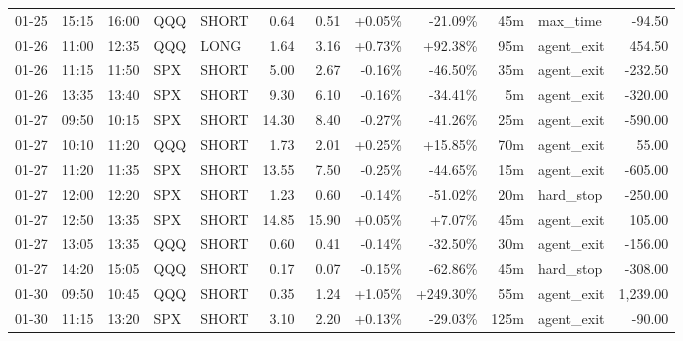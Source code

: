 \documentclass[11pt,a4paper,twoside]{article}
\begin{document}
\begin{center}
\begin{longtable}{>{\color{txtmain}}l l l l l r r r r r >{\color{txtmain}}l r}
01-25 & 15:15 & 16:00 & QQQ & SHORT & 0.64 & 0.51 & \textcolor{wingreen}{+0.05\%} & \textcolor{lossred}{-21.09\%} & 45m & max\_time & \textcolor{lossred}{-94.50} \\
01-26 & 11:00 & 12:35 & QQQ & LONG & 1.64 & 3.16 & \textcolor{wingreen}{+0.73\%} & \textcolor{wingreen}{+92.38\%} & 95m & agent\_exit & \textcolor{wingreen}{454.50} \\
01-26 & 11:15 & 11:50 & SPX & SHORT & 5.00 & 2.67 & \textcolor{lossred}{-0.16\%} & \textcolor{lossred}{-46.50\%} & 35m & agent\_exit & \textcolor{lossred}{-232.50} \\
01-26 & 13:35 & 13:40 & SPX & SHORT & 9.30 & 6.10 & \textcolor{lossred}{-0.16\%} & \textcolor{lossred}{-34.41\%} & 5m & agent\_exit & \textcolor{lossred}{-320.00} \\
01-27 & 09:50 & 10:15 & SPX & SHORT & 14.30 & 8.40 & \textcolor{lossred}{-0.27\%} & \textcolor{lossred}{-41.26\%} & 25m & agent\_exit & \textcolor{lossred}{-590.00} \\
01-27 & 10:10 & 11:20 & QQQ & SHORT & 1.73 & 2.01 & \textcolor{wingreen}{+0.25\%} & \textcolor{wingreen}{+15.85\%} & 70m & agent\_exit & \textcolor{wingreen}{55.00} \\
01-27 & 11:20 & 11:35 & SPX & SHORT & 13.55 & 7.50 & \textcolor{lossred}{-0.25\%} & \textcolor{lossred}{-44.65\%} & 15m & agent\_exit & \textcolor{lossred}{-605.00} \\
01-27 & 12:00 & 12:20 & SPX & SHORT & 1.23 & 0.60 & \textcolor{lossred}{-0.14\%} & \textcolor{lossred}{-51.02\%} & 20m & hard\_stop & \textcolor{lossred}{-250.00} \\
01-27 & 12:50 & 13:35 & SPX & SHORT & 14.85 & 15.90 & \textcolor{wingreen}{+0.05\%} & \textcolor{wingreen}{+7.07\%} & 45m & agent\_exit & \textcolor{wingreen}{105.00} \\
01-27 & 13:05 & 13:35 & QQQ & SHORT & 0.60 & 0.41 & \textcolor{lossred}{-0.14\%} & \textcolor{lossred}{-32.50\%} & 30m & agent\_exit & \textcolor{lossred}{-156.00} \\
01-27 & 14:20 & 15:05 & QQQ & SHORT & 0.17 & 0.07 & \textcolor{lossred}{-0.15\%} & \textcolor{lossred}{-62.86\%} & 45m & hard\_stop & \textcolor{lossred}{-308.00} \\
01-30 & 09:50 & 10:45 & QQQ & SHORT & 0.35 & 1.24 & \textcolor{wingreen}{+1.05\%} & \textcolor{wingreen}{+249.30\%} & 55m & agent\_exit & \textcolor{wingreen}{1,239.00} \\
01-30 & 11:15 & 13:20 & SPX & SHORT & 3.10 & 2.20 & \textcolor{wingreen}{+0.13\%} & \textcolor{lossred}{-29.03\%} & 125m & agent\_exit & \textcolor{lossred}{-90.00} \\

\end{longtable}
\end{center}
\end{document}
